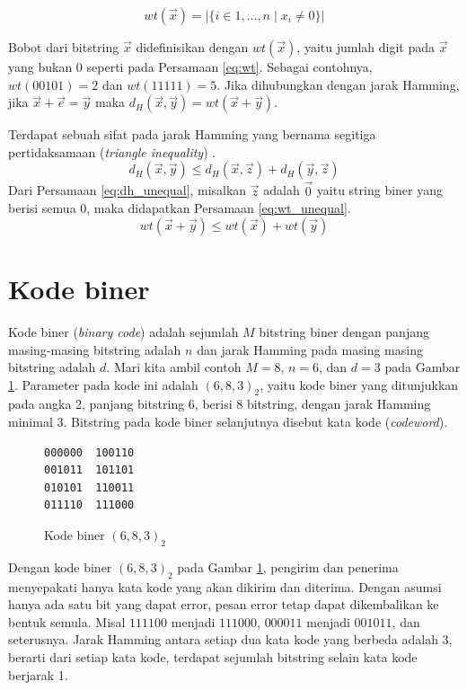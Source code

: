 \begin{equation} \label{eq:wt}
wt(\vec{x}) = |\{i \in {1,\ldots,n} \mid x_i \neq 0\}|
\end{equation}

Bobot dari bitstring $\vec{x}$ didefinisikan dengan $wt(\vec{x})$, yaitu jumlah digit pada $\vec{x}$ yang bukan $0$ seperti pada Persamaan \ref{eq:wt}. Sebagai contohnya, $wt(00101) = 2$ dan $wt(11111) = 5$. Jika dihubungkan dengan jarak Hamming, jika $\vec{x}+\vec{e} = \vec{y}$ maka $d_H(\vec{x},\vec{y}) = wt(\vec{x}+\vec{y})$.

Terdapat sebuah sifat pada jarak Hamming yang bernama segitiga pertidaksamaan (\textit{triangle inequality}) \cite{VanLint2016}.
\begin{equation} \label{eq:dh_unequal}
d_H(\vec{x},\vec{y}) \le d_H(\vec{x},\vec{z}) + d_H(\vec{y},\vec{z})
\end{equation}
Dari Persamaan \ref{eq:dh_unequal}, misalkan $\vec{z}$ adalah $\vec{0}$ yaitu string biner yang berisi semua $0$, maka didapatkan Persamaan \ref{eq:wt_unequal}.
\begin{equation} \label{eq:wt_unequal}
wt(\vec{x}+\vec{y}) \le wt(\vec{x}) + wt(\vec{y})
\end{equation}


\section{Kode biner}

Kode biner (\textit{binary code}) adalah sejumlah $M$ bitstring biner dengan panjang masing-masing bitstring adalah $n$ dan jarak Hamming pada masing masing bitstring adalah $d$. Mari kita ambil contoh $M=8$, $n=6$, dan $d=3$ pada Gambar \ref{fig:binarycode683}. Parameter pada kode ini adalah $(6,8,3)_2$, yaitu kode biner yang ditunjukkan pada angka 2, panjang bitstring 6, berisi 8 bitstring, dengan jarak Hamming minimal 3. Bitstring pada kode biner selanjutnya disebut kata kode (\textit{codeword}).

\begin{figure}
\centering
\begin{BVerbatim}
000000  100110
001011  101101
010101  110011
011110  111000
\end{BVerbatim}
\caption{Kode biner $(6,8,3)_2$}
\label{fig:binarycode683}
\end{figure}

Dengan kode biner $(6,8,3)_2$ pada Gambar \ref{fig:binarycode683}, pengirim dan penerima menyepakati hanya kata kode yang akan dikirim dan diterima. Dengan asumsi hanya ada satu bit yang dapat error, pesan error tetap dapat dikembalikan ke bentuk semula. Misal $111100$ menjadi $111000$, $000011$ menjadi $001011$, dan seterusnya. Jarak Hamming antara setiap dua kata kode yang berbeda adalah 3, berarti dari setiap kata kode, terdapat sejumlah bitstring selain kata kode berjarak 1.


